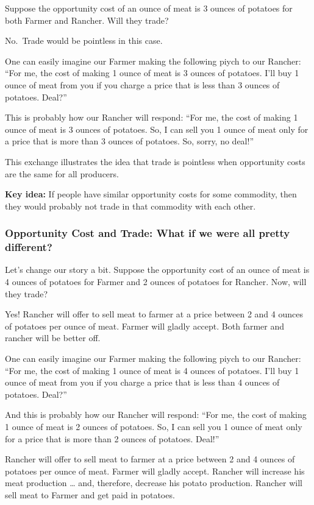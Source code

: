 \documentclass[
  letterpaper,
]{book}
\begin{document}
Suppose the opportunity cost of an ounce of meat is 3 ounces of potatoes
for both Farmer and Rancher. Will they trade?

No.~Trade would be pointless in this case.

One can easily imagine our Farmer making the following piych to our
Rancher: ``For me, the cost of making 1 ounce of meat is 3 ounces of
potatoes. I'll buy 1 ounce of meat from you if you charge a price that
is less than 3 ounces of potatoes. Deal?''

This is probably how our Rancher will respond: ``For me, the cost of
making 1 ounce of meat is 3 ounces of potatoes. So, I can sell you 1
ounce of meat only for a price that is more than 3 ounces of potatoes.
So, sorry, no deal!''

This exchange illustrates the idea that trade is pointless when
opportunity costs are the same for all producers.

\textbf{Key idea:} If people have similar opportunity costs for some
commodity, then they would probably not trade in that commodity with
each other.

\subsubsection{Opportunity Cost and Trade: What if we were all pretty
different?}\label{opportunity-cost-and-trade-what-if-we-were-all-pretty-different}

Let's change our story a bit. Suppose the opportunity cost of an ounce
of meat is 4 ounces of potatoes for Farmer and 2 ounces of potatoes for
Rancher. Now, will they trade?

Yes! Rancher will offer to sell meat to farmer at a price between 2 and
4 ounces of potatoes per ounce of meat. Farmer will gladly accept. Both
farmer and rancher will be better off.

One can easily imagine our Farmer making the following piych to our
Rancher: ``For me, the cost of making 1 ounce of meat is 4 ounces of
potatoes. I'll buy 1 ounce of meat from you if you charge a price that
is less than 4 ounces of potatoes. Deal?''

And this is probably how our Rancher will respond: ``For me, the cost of
making 1 ounce of meat is 2 ounces of potatoes. So, I can sell you 1
ounce of meat only for a price that is more than 2 ounces of potatoes.
Deal!''

Rancher will offer to sell meat to farmer at a price between 2 and 4
ounces of potatoes per ounce of meat. Farmer will gladly accept. Rancher
will increase his meat production \ldots{} and, therefore, decrease his
potato production. Rancher will sell meat to Farmer and get paid in
potatoes.
\end{document}
